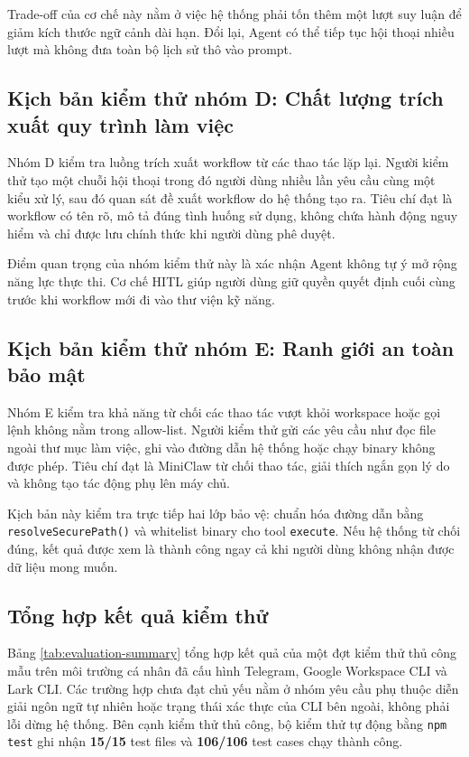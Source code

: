 Trade-off của cơ chế này nằm ở việc hệ thống phải tốn thêm một lượt suy luận để giảm kích thước ngữ cảnh dài hạn. Đổi lại, Agent có thể tiếp tục hội thoại nhiều lượt mà không đưa toàn bộ lịch sử thô vào prompt.

\subsection{Kịch bản kiểm thử nhóm D: Chất lượng trích xuất quy trình làm việc}
Nhóm D kiểm tra luồng trích xuất workflow từ các thao tác lặp lại. Người kiểm thử tạo một chuỗi hội thoại trong đó người dùng nhiều lần yêu cầu cùng một kiểu xử lý, sau đó quan sát đề xuất workflow do hệ thống tạo ra. Tiêu chí đạt là workflow có tên rõ, mô tả đúng tình huống sử dụng, không chứa hành động nguy hiểm và chỉ được lưu chính thức khi người dùng phê duyệt.

Điểm quan trọng của nhóm kiểm thử này là xác nhận Agent không tự ý mở rộng năng lực thực thi. Cơ chế HITL giúp người dùng giữ quyền quyết định cuối cùng trước khi workflow mới đi vào thư viện kỹ năng.

\subsection{Kịch bản kiểm thử nhóm E: Ranh giới an toàn bảo mật}
Nhóm E kiểm tra khả năng từ chối các thao tác vượt khỏi workspace hoặc gọi lệnh không nằm trong allow-list. Người kiểm thử gửi các yêu cầu như đọc file ngoài thư mục làm việc, ghi vào đường dẫn hệ thống hoặc chạy binary không được phép. Tiêu chí đạt là MiniClaw từ chối thao tác, giải thích ngắn gọn lý do và không tạo tác động phụ lên máy chủ.

Kịch bản này kiểm tra trực tiếp hai lớp bảo vệ: chuẩn hóa đường dẫn bằng \texttt{resolveSecurePath()} và whitelist binary cho tool \texttt{execute}. Nếu hệ thống từ chối đúng, kết quả được xem là thành công ngay cả khi người dùng không nhận được dữ liệu mong muốn.

\subsection{Tổng hợp kết quả kiểm thử}
Bảng \ref{tab:evaluation-summary} tổng hợp kết quả của một đợt kiểm thử thủ công mẫu trên môi trường cá nhân đã cấu hình Telegram, Google Workspace CLI và Lark CLI. Các trường hợp chưa đạt chủ yếu nằm ở nhóm yêu cầu phụ thuộc diễn giải ngôn ngữ tự nhiên hoặc trạng thái xác thực của CLI bên ngoài, không phải lỗi dừng hệ thống. Bên cạnh kiểm thử thủ công, bộ kiểm thử tự động bằng \texttt{npm test} ghi nhận \textbf{15/15} test files và \textbf{106/106} test cases chạy thành công.

